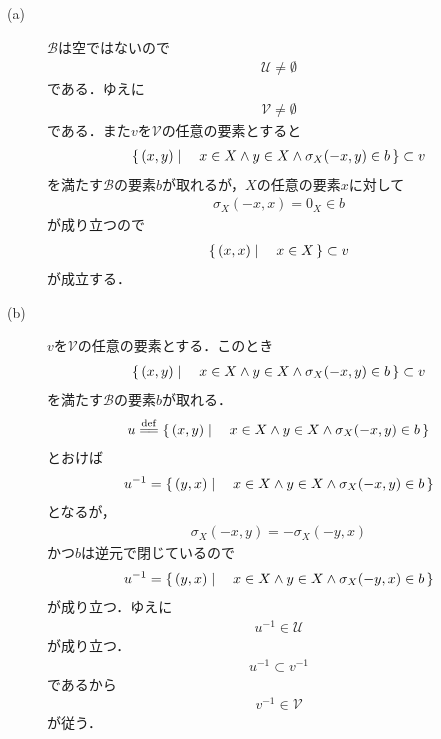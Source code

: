 	\begin{sketch}\mbox{}
	\begin{description}
		\item[(a)] $\mathscr{B}$は空ではないので
			\begin{align}
				\mathscr{U} \neq \emptyset
			\end{align}
			である．ゆえに
			\begin{align}
				\mathscr{V} \neq \emptyset
			\end{align}
			である．また$v$を$\mathscr{V}$の任意の要素とすると
			\begin{align}
				\left\{\, (x,y) \mid \quad x \in X \wedge y \in X \wedge \sigma_X(-x,y) \in b\, \right\} \subset v
			\end{align}
			を満たす$\mathscr{B}$の要素$b$が取れるが，$X$の任意の要素$x$に対して
			\begin{align}
				\sigma_X(-x,x) = 0_X \in b
			\end{align}
			が成り立つので
			\begin{align}
				\left\{\, (x,x) \mid \quad x \in X\, \right\} \subset v
			\end{align}
			が成立する．
			
		\item[(b)] $v$を$\mathscr{V}$の任意の要素とする．このとき
			\begin{align}
				\left\{\, (x,y) \mid \quad x \in X \wedge y \in X \wedge \sigma_X(-x,y) \in b\, \right\} \subset v
			\end{align}
			を満たす$\mathscr{B}$の要素$b$が取れる．
			\begin{align}
				u \defeq \Set{(x,y)}{x \in X \wedge y \in X \wedge \sigma_X(-x,y) \in b}
			\end{align}
			とおけば
			\begin{align}
				u^{-1} = \left\{\, (y,x) \mid \quad x \in X \wedge y \in X \wedge \sigma_X(-x,y) \in b\, \right\}
			\end{align}
			となるが，
			\begin{align}
				\sigma_X(-x,y) = -\sigma_X(-y,x)
			\end{align}
			かつ$b$は逆元で閉じているので
			\begin{align}
				u^{-1} = \left\{\, (y,x) \mid \quad x \in X \wedge y \in X \wedge \sigma_X(-y,x) \in b\, \right\}
			\end{align}
			が成り立つ．ゆえに
			\begin{align}
				u^{-1} \in \mathscr{U}
			\end{align}
			が成り立つ．
			\begin{align}
				u^{-1} \subset v^{-1}
			\end{align}
			であるから
			\begin{align}
				v^{-1} \in \mathscr{V}
			\end{align}
			が従う．
			

\end{description}
\end{sketch}
